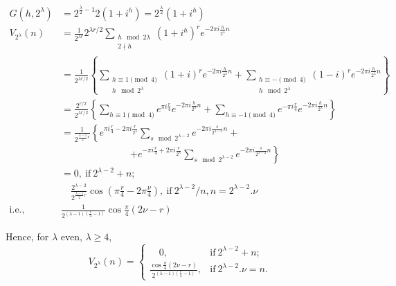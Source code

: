 \begin{align*}
    G(h, 2^\lambda) & = 2^{\frac{\lambda}{2}-1} 2(1+ i^h) =
    2^{\frac{\lambda}{2}} (1+ i^h)\\
    V_{2^\lambda} (n) & = \frac{1}{2^{\lambda r}} 2^{\lambda r/2}
      \sum_{\substack{h \mod 2 \lambda\\2\nmid h}} (1+ i^h)^r e^{- 2 \pi i
        \frac{h}{2^\lambda}n}\\
      & = \frac{1}{2^{\lambda r/2}} \left\{ \sum_{\substack{h \equiv 1
      \pmod{4}\\ h \mod 2^\lambda}} (1+ i)^r e^{-2 \pi i
        \frac{h}{2^\lambda} n}+ \sum_{\substack{h \equiv - \pmod{4}\\h
      \mod 2^\lambda}} (1- i)^r e^{-2 \pi i \frac{h}{2^\lambda} n}
      \right\}\\
      & =\frac{2^{r/2}}{2^{\lambda r/2}} \left\{ \sum_{h \equiv 1
        \pmod{4}} e^{\pi i \frac{r}{4}} e^{- 2 \pi i
        \frac{h}{2^\lambda}n} + \sum_{h \equiv -1 \pmod{4}} e^{- \pi i
      \frac{r}{4}} e^{- 2 \pi i \frac{h}{2^\lambda}n} \right\}\\
    & = \frac{1}{2^{\frac{\lambda-1}{2}r}} \left\{ e^{\pi i
        \frac{r}{4}- 2 \pi i \frac{r}{2^\lambda}} \sum_{s \mod
        2^{\lambda-2}} e^{- 2 \pi i \frac{s}{2^{\lambda-2}}n} +
      \right.\\
      & \hspace{3cm}\left. + e^{- \pi i \frac{r}{4}+ 2 \pi i \frac{r}{2^\lambda}}
      \sum_{s \mod 2^{\lambda -2}} e^{ -2 \pi i \frac{s}{2^{\lambda
            -2}}n} \right\}\\
     &  = 0, ~\text{if}~ 2^{\lambda-2} +n;\\
     & \quad  \frac{2^{\lambda-2}}{2^{\frac{\lambda-1}{2}r}} \cos \left(\pi
      \frac{r}{4} - 2 \pi \frac{\nu}{4} \right), ~\text{if}~
      2^{\lambda-2}/n, n= 2^{\lambda-2}.\nu\\
     \text{i.e.,} &  \frac{1}{2^{(\lambda-1) (\frac{r}{4}-1)}} \cos
     \frac{\pi}{4} (2 \nu -r)
\end{align*}\pageoriginale

Hence, for $\lambda$ even, $\lambda\geq 4$,
\begin{equation*}
V_{2^\lambda} (n) =
\begin{cases}
  \quad 0, & \text{if}~ 2^{\lambda -2} +n;\\
  \frac{\cos \frac{\pi}{4} (2 \nu - r)}{2^{(\lambda-1)(\frac{r}{2}
      -1)}}, & \text{if}~ 2^{\lambda -2}. \nu =n.
\end{cases}\tag{*}\label{part4:lec37:eq*}
\end{equation*}

